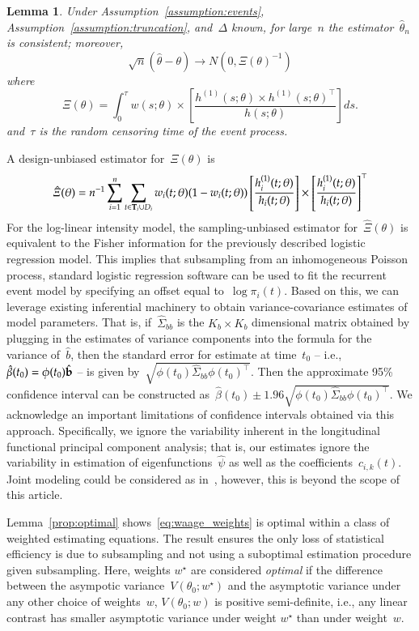 \documentclass[12pt]{amsart}
\newtheorem{lemma}[thm]{Lemma}
\def\bfT{{\bf T}}
\newenvironment{newmaterial}{\color{blue}}{\par}
\begin{document}
\begin{lemma} \normalfont
\label{lemma:simpleasym}
Under Assumption~\ref{assumption:events}, Assumption~\ref{assumption:truncation}, and~$\Delta$ known, for large~$n$ the estimator~$\hat \theta_n$ is consistent; moreover,
\[
\sqrt{n} (\hat \theta - \theta) \to N(0, \Xi (\theta)^{-1})
\]
where
\[
  \Xi (\theta) = \int_{0}^{\tau} w(s; \theta) \times \left[ \frac{h^{(1)}(s;
      \theta) \times  h^{(1)} (s;\theta)^{\top}}{h(s; \theta)} \right]
  ds.
\]
and~$\tau$ is the random censoring time of the event process.
\end{lemma}
A design-unbiased estimator for~$\Xi(\theta)$ is
\begin{equation}
\label{eq:fisher}
  \hat \Xi (\theta) = n^{-1} \sum_{i=1}^n \sum_{t \in \bfT_i \cup D_i}
  w_i(t;\theta) (1-w_i(t;\theta)) \left[ \frac{h_i^{(1)}(t;
      \theta)}{h_i (t; \theta)} \right] \times  \left [
    \frac{h_i^{(1)} (t;\theta)}{h_i(t; \theta)} \right]^\top
\end{equation}
For the log-linear intensity model, the sampling-unbiased estimator for~$\hat \Xi(\theta)$ is equivalent to the Fisher information for the previously described logistic regression model.
This implies that subsampling from an inhomogeneous Poisson process, standard logistic regression software can be used to fit the recurrent event model by specifying an offset equal to~$\log \pi_i (t)$.
\begin{newmaterial}
Based on this, we can leverage existing inferential machinery to obtain variance-covariance estimates of model parameters. That is, if~$\hat \Sigma_{bb}$ is the $K_b \times K_b$ dimensional matrix obtained by plugging in the estimates of variance components into the formula for the variance of~$\hat b$, then the standard error for estimate at time~$t_0$ -- i.e., ~$\hat \beta (t_0) = \phi(t_0) \hat {\bf b}$ -- is given by~$\sqrt{ \phi (t_0 ) \hat \Sigma_{bb} \phi(t_0)^\top}$.  Then the approximate 95\% confidence interval can be constructed as~$\hat \beta (t_0) \pm 1.96 \sqrt{\phi (t_0) \hat \Sigma_{bb} \phi(t_0)^\top}$.  We acknowledge an important limitations of confidence intervals obtained via this approach. Specifically, we ignore the variability inherent in the longitudinal functional principal component analysis; that is, our estimates ignore the variability in estimation of eigenfunctions~$\hat \psi$ as well as the coefficients~$\hat c_{i,k}(t)$. Joint modeling could be considered as in~\cite{Crainiceanu2010}, however, this is beyond the scope of this article.

Lemma~\ref{prop:optimal} shows~\eqref{eq:waage_weights} is optimal within a class of weighted estimating equations. The result ensures the only loss of statistical efficiency is due to subsampling and not using a suboptimal estimation procedure given subsampling.  Here, weights $w^\star$ are considered \emph{optimal} if the difference between the asympotic variance~$V (\theta_0; w^\star)$ and the asymptotic variance under any other choice of weights~$w$, $V(\theta_0; w)$ is positive semi-definite, i.e., any linear contrast has smaller asymptotic variance under weight $w^\star$ than under weight~$w$.
\end{newmaterial}
\end{document}
